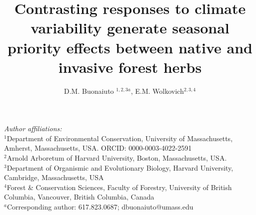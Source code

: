 \documentclass{article}[11pt]
\title{Contrasting responses to climate variability generate seasonal priority effects between native and invasive forest herbs}
\author{D.M. Buonaiuto $^{1,2,3a}$, E.M. Wolkovich$^{2,3,4}$}
\date{}
\begin{document}

\maketitle

\noindent \emph{Author affiliations:}\\
\noindent $^1$Department of Environmental Conservation, University of Massachusetts, Amherst, Massachusetts, USA. ORCID: 0000-0003-4022-2591\\
\noindent $^2$Arnold Arboretum of Harvard University, Boston, Massachusetts, USA.\\
$^3$Department of Organismic and Evolutionary Biology, Harvard University, Cambridge, Massachusetts, USA \\
$^4$Forest \& Conservation Sciences, Faculty of Forestry, University of British Columbia, Vancouver, British Columbia, Canada\\
$^a$Corresponding author: 617.823.0687; dbuonaiuto@umass.edu\\

\pagebreak
\end{document}
